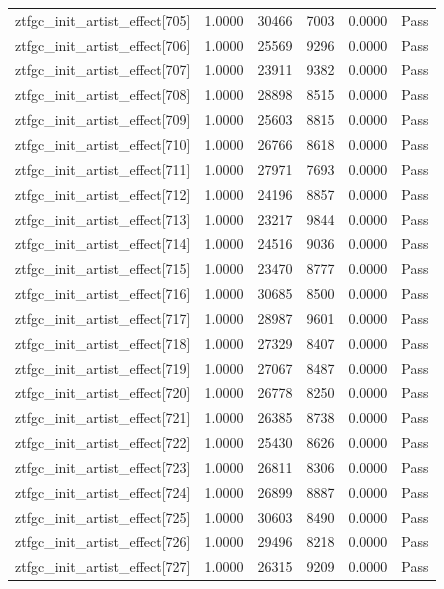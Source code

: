 \begin{table}[htbp]
\begin{tabular}{llrrll}
ztfgc\_init\_artist\_effect[705] & 1.0000 & 30466 & 7003 & 0.0000 & Pass \\
ztfgc\_init\_artist\_effect[706] & 1.0000 & 25569 & 9296 & 0.0000 & Pass \\
ztfgc\_init\_artist\_effect[707] & 1.0000 & 23911 & 9382 & 0.0000 & Pass \\
ztfgc\_init\_artist\_effect[708] & 1.0000 & 28898 & 8515 & 0.0000 & Pass \\
ztfgc\_init\_artist\_effect[709] & 1.0000 & 25603 & 8815 & 0.0000 & Pass \\
ztfgc\_init\_artist\_effect[710] & 1.0000 & 26766 & 8618 & 0.0000 & Pass \\
ztfgc\_init\_artist\_effect[711] & 1.0000 & 27971 & 7693 & 0.0000 & Pass \\
ztfgc\_init\_artist\_effect[712] & 1.0000 & 24196 & 8857 & 0.0000 & Pass \\
ztfgc\_init\_artist\_effect[713] & 1.0000 & 23217 & 9844 & 0.0000 & Pass \\
ztfgc\_init\_artist\_effect[714] & 1.0000 & 24516 & 9036 & 0.0000 & Pass \\
ztfgc\_init\_artist\_effect[715] & 1.0000 & 23470 & 8777 & 0.0000 & Pass \\
ztfgc\_init\_artist\_effect[716] & 1.0000 & 30685 & 8500 & 0.0000 & Pass \\
ztfgc\_init\_artist\_effect[717] & 1.0000 & 28987 & 9601 & 0.0000 & Pass \\
ztfgc\_init\_artist\_effect[718] & 1.0000 & 27329 & 8407 & 0.0000 & Pass \\
ztfgc\_init\_artist\_effect[719] & 1.0000 & 27067 & 8487 & 0.0000 & Pass \\
ztfgc\_init\_artist\_effect[720] & 1.0000 & 26778 & 8250 & 0.0000 & Pass \\
ztfgc\_init\_artist\_effect[721] & 1.0000 & 26385 & 8738 & 0.0000 & Pass \\
ztfgc\_init\_artist\_effect[722] & 1.0000 & 25430 & 8626 & 0.0000 & Pass \\
ztfgc\_init\_artist\_effect[723] & 1.0000 & 26811 & 8306 & 0.0000 & Pass \\
ztfgc\_init\_artist\_effect[724] & 1.0000 & 26899 & 8887 & 0.0000 & Pass \\
ztfgc\_init\_artist\_effect[725] & 1.0000 & 30603 & 8490 & 0.0000 & Pass \\
ztfgc\_init\_artist\_effect[726] & 1.0000 & 29496 & 8218 & 0.0000 & Pass \\
ztfgc\_init\_artist\_effect[727] & 1.0000 & 26315 & 9209 & 0.0000 & Pass \\

\end{tabular}
\end{table}
